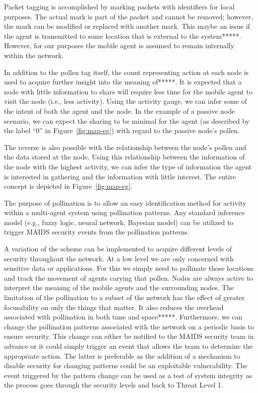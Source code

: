 \documentclass{acm_proc_article-sp}
\begin{document}
Packet tagging is accomplished by marking packets with identifiers for local purposes.  The actual mark is part of the packet and cannot be removed; however, the mark can be modified or replaced with another mark.  This maybe an issue if the agent is transmitted to some location that is external to the system*****.  However, for our purposes the mobile agent is assumed to remain internally within the network.

In addition to the pollen tag itself, the count representing action at each node is used to acquire further insight into the meaning of*****.  It is expected that a node with little information to share will require less time for the mobile agent to visit the node (i.e., less activity).  Using the activity gauge, we can infer some of the intent of both the agent and the node.  In the example of a passive node scenario, we can expect the sharing to be minimal for the agent (as described by the label ``0'' in Figure~\ref{fig:map-eg}) with regard to the passive node's pollen.

The reverse is also possible with the relationship between the node's pollen and the data stored at the node.  Using this relationship between the information of the node with the highest activity, we can infer the type of information the agent is interested in gathering and the information with little interest.  The entire concept is depicted in Figure~\ref{fig:map-eg}.

The purpose of pollination is to allow an easy identification method for activity within a multi-agent system using pollination patterns.  Any standard inference model (e.g., fuzzy logic, neural network, Bayesian model) can be utilized to trigger MAIDS security events from the pollination patterns.

A variation of the scheme can be implemented to acquire different levels of security throughout the network.  At a low level we are only concerned with sensitive data or applications.  For this we simply need to pollinate those locations and track the movement of agents carying that pollen.  Nodes are always active to interpret the meaning of the mobile agents and the surrounding nodes.  The limitation of the pollination to a subset of the network has the effect of greater focusability on only the things that matter.  It also reduces the overhead associated with pollination in both time and space*****.  Furthermore, we can change the pollination patterns associated with the network on a periodic basis to ensure security.  This change can either be notified to the MAIDS security team in advance or it could simply trigger an event that allows the team to determine the appropriate action.  The latter is preferable as the addition of a mechanism to disable security for changing patterns could be an exploitable vulnerability.  The event triggered by the pattern change can be used as a test of system integrity as the process goes through the security levels and back to Threat Level 1.
\end{document}
